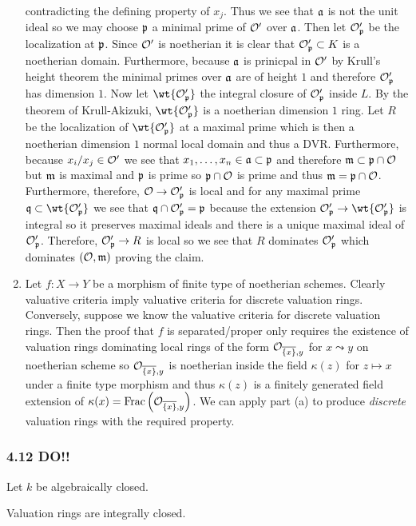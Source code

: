 \documentclass[12pt]{article}
\begin{document}
\begin{enumerate}
contradicting the defining property of $x_j$. Thus we see that $\mathfrak{a}$ is not the unit ideal so we may choose $\mathfrak{p}$ a minimal prime of $\mathcal{O}'$ over $\mathfrak{a}$. Then let $\mathcal{O}'_{\mathfrak{p}}$ be the localization at $\mathfrak{p}$. Since $\mathcal{O}'$ is noetherian it is clear that $\mathcal{O}'_{\mathfrak{p}} \subset K$ is a noetherian domain.  Furthermore, because $\mathfrak{a}$ is prinicpal in $\mathcal{O}'$ by Krull's height theorem the minimal primes over $\mathfrak{a}$ are of height $1$ and therefore $\mathcal{O}'_{\mathfrak{p}}$ has dimension $1$. Now let $\wt{\O'_\p}$ the integral closure of $\mathcal{O}'_{\mathfrak{p}}$ inside $L$. By the theorem of Krull-Akizuki, $\wt{\O'_\p}$ is a noetherian dimension $1$ ring. Let $R$ be the localization of $\wt{\O'_\p}$ at a maximal prime which is then a noetherian dimension $1$ normal local domain and thus a DVR. Furthermore, because $x_i/x_j \in \mathcal{O}'$ we see that $x_1, \dots, x_n \in \mathfrak{a} \subset \mathfrak{p}$ and therefore $\mathfrak{m} \subset \mathfrak{p} \cap \mathcal{O}$ but $\mathfrak{m}$ is maximal and $\mathfrak{p}$ is prime so $\mathfrak{p} \cap \mathcal{O}$ is prime and thus $\mathfrak{m} = \mathfrak{p} \cap \mathcal{O}$. Furthermore, therefore, $\mathcal{O} \to \mathcal{O}'_{\mathfrak{p}}$ is local and for any maximal prime $\q \subset \wt{\O'_\p}$ we see that $\mathfrak{q} \cap \mathcal{O}'_{\mathfrak{p}} = \mathfrak{p}$ because the extension $\O'_\p \to \wt{\O'_\p}$ is integral so it preserves maximal ideals and there is a unique maximal ideal of $\mathcal{O}'_{\mathfrak{p}}$. Therefore, $\mathcal{O}'_{\mathfrak{p}} \to R$ is local so we see that $R$ dominates $\mathcal{O}'_{\mathfrak{p}}$ which dominates $(\mathcal{O}, \mathfrak{m})$ proving the claim. 

\item Let $f : X \to Y$ be a morphism of finite type of noetherian schemes. Clearly valuative criteria imply valuative criteria for discrete valuation rings. Conversely, suppose we know the valuative criteria for discrete valuation rings. Then the proof that $f$ is separated/proper only requires the existence of valuation rings dominating local rings of the form $\mathcal{O}_{\overline{\{x\}}, y}$ for $x \leadsto y$ on noetherian scheme so $\mathcal{O}_{\overline{\{x\}}, y}$ is noetherian inside the field $\kappa(z)$ for $z \mapsto x$ under a finite type morphism and thus $\kappa(z)$ is a finitely generated field extension of $\kappa(x) = \mathrm{Frac}\left(\mathcal{O}_{\overline{\{x\}}, y}\right)$. We can apply part (a) to produce \textit{discrete} valuation rings with the required property.
\end{enumerate}

\subsubsection{4.12 DO!!}

Let $k$ be algebraically closed.

\begin{lemma}
Valuation rings are integrally closed.
\end{lemma}
\end{document}
